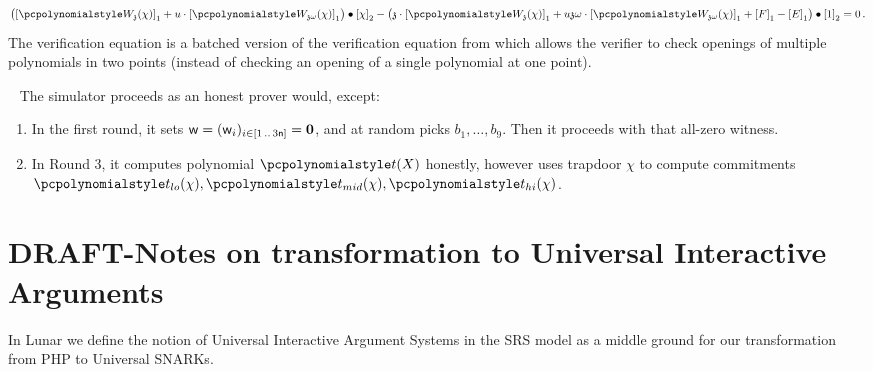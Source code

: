 \documentclass[runningheads,11pt]{llncs}
\begin{document}
\begin{description}
\begin{multline}
		\label{eq:ver_eq}
		\left( \gone{\p{W_{\chz}}(\chi)} + u \cdot \gone{\p{W_{\chz
                \omega}}(\chi)} \right) \bullet
		\gtwo{\chi} - %
		\left( \chz \cdot \gone{\p{W_{\chz}}(\chi)} + u \chz \omega \cdot
          \gone{\p{W_{\chz \omega}}(\chi)} + \gone{F} - \gone{E} \right) \bullet
        \gtwo{1} = 0\,.
	\end{multline}
  The verification equation is a batched version of the verification equation
  from \cite{AC:KatZavGol10} which allows the verifier to check openings of
  multiple polynomials in two points (instead of checking an opening of a single
  polynomial at one point).
\end{description}

\ \newline
The \plonk{} simulator proceeds as an honest prover would, except:
\begin{enumerate}
  \item In the first round, it sets $\wit = (\wit_i)_{i \in \range{1}{3 \noofc}}
    = \vec{0}$, and at random picks $b_1, \ldots, b_9$. Then it proceeds with
    that all-zero witness.
  \item In Round 3, it computes polynomial $\pt(X)$ honestly, however uses
    trapdoor $\chi$ to compute commitments
    $\p{t_{lo}}(\chi), \p{t_{mid}}(\chi), \p{t_{hi}}(\chi)$.
  \end{enumerate}

































\section{DRAFT-Notes on transformation to Universal Interactive Arguments}

In Lunar we define the notion of Universal Interactive Argument Systems in the SRS model
as a middle ground for our transformation from PHP to Universal SNARKs.
\end{document}

